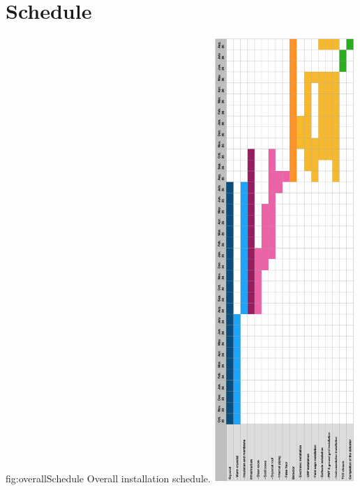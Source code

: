 \section{Schedule}
\label{ch:dp-tc-schedrisk}



\begin{dunefigure}{fig:overallSchedule}
{Overall installation schedule.}
\includegraphics[width=0.4\textwidth]{graphics/overallSchedule.png}
\end{dunefigure}

